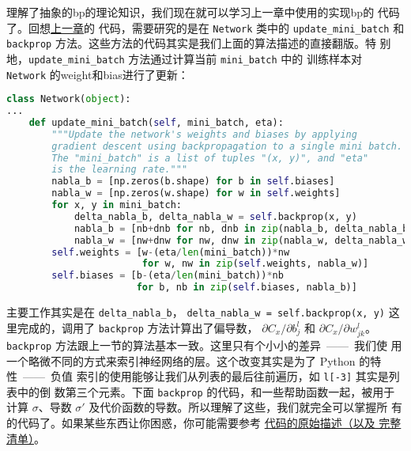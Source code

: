 理解了抽象的\gls*{bp}的理论知识，我们现在就可以学习上一章中使用的实现\gls*{bp}的
代码了。回想\hyperref[sec:implementing_our_network_to_classify_digits]{上一章}的
代码，需要研究的是在 \lstinline!Network! 类中的 \lstinline!update_mini_batch! 和
\lstinline!backprop! 方法。这些方法的代码其实是我们上面的算法描述的直接翻版。特
别地，\lstinline!update_mini_batch! 方法通过计算当前 \lstinline!mini_batch! 中的
训练样本对 \lstinline!Network! 的\gls*{weight}和\gls*{bias}进行了更新：

\begin{lstlisting}[language=Python]
class Network(object):
...
    def update_mini_batch(self, mini_batch, eta):
        """Update the network's weights and biases by applying
        gradient descent using backpropagation to a single mini batch.
        The "mini_batch" is a list of tuples "(x, y)", and "eta"
        is the learning rate."""
        nabla_b = [np.zeros(b.shape) for b in self.biases]
        nabla_w = [np.zeros(w.shape) for w in self.weights]
        for x, y in mini_batch:
            delta_nabla_b, delta_nabla_w = self.backprop(x, y)
            nabla_b = [nb+dnb for nb, dnb in zip(nabla_b, delta_nabla_b)]
            nabla_w = [nw+dnw for nw, dnw in zip(nabla_w, delta_nabla_w)]
        self.weights = [w-(eta/len(mini_batch))*nw
                        for w, nw in zip(self.weights, nabla_w)]
        self.biases = [b-(eta/len(mini_batch))*nb
                       for b, nb in zip(self.biases, nabla_b)]
\end{lstlisting}

主要工作其实是在 \lstinline!delta_nabla_b!，%
\lstinline!delta_nabla_w = self.backprop(x, y)! 这里完成的，调用了
\lstinline!backprop! 方法计算出了偏导数，
$\partial C_x/\partial b_j^l$ 和 $\partial C_x/\partial w_{jk}^l$。
\lstinline!backprop! 方法跟上一节的算法基本一致。这里只有个小小的差异~——~我们使
用一个略微不同的方式来索引神经网络的层。这个改变其实是为了 Python 的特性~——~负值
索引的使用能够让我们从列表的最后往前遍历，如 \lstinline!l[-3]!  其实是列表中的倒
数第三个元素。下面 \lstinline!backprop! 的代码，和一些帮助函数一起，被用于计算
$\sigma$、导数 $\sigma'$ 及代价函数的导数。所以理解了这些，我们就完全可以掌握所
有的代码了。如果某些东西让你困惑，你可能需要参考%
\hyperref[sec:implementing_our_network_to_classify_digits]{代码的原始描述（以及
    完整清单）}。


